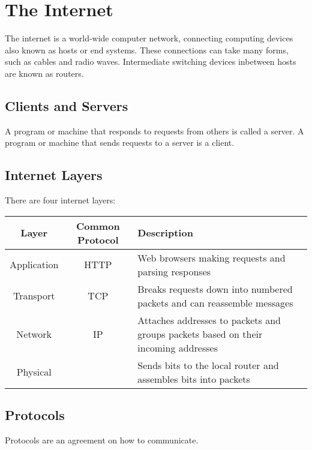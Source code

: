 \section{The Internet}

The internet is a world-wide computer network, connecting computing devices
also known as hosts or end systems. These connections can take many forms,
such as cables and radio waves. Intermediate switching devices inbetween
hosts are known as routers.

\subsection{Clients and Servers}

A program or machine that responds to requests from others is called a server.
A program or machine that sends requests to a server is a client.

\subsection{Internet Layers}

There are four internet layers: \begin{center}
    \begin{tabular}{ | c | c | p{6cm} | }
        \hline
        Layer & Common Protocol & Description \\     
        \hline \hline
        Application & HTTP & 
        Web browsers making requests and parsing responses \\
        \hline
        Transport   & TCP  & 
        Breaks requests down into numbered packets and
        can reassemble messages \\
        \hline
        Network     & IP   & 
        Attaches addresses to packets and groups
        packets based on their incoming addresses \\
        \hline
        Physical    &      & 
        Sends bits to the local router and assembles bits 
        into packets \\
        \hline
    \end{tabular}
\end{center}

\subsection{Protocols}

Protocols are an agreement on how to communicate.

